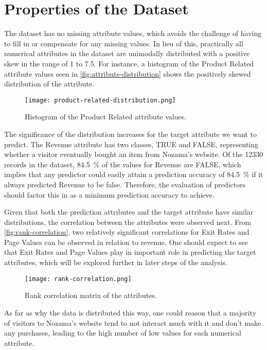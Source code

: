 \documentclass[../cmpe-251-project-report.tex]{subfiles}
\begin{document}
  \chapter{Properties of the Dataset}\label{ch:dataset-properties}
  The dataset has no missing attribute values, which avoids the challenge of having to fill in or compensate for any missing values. In lieu of this, practically all numerical attributes in the dataset are unimodally distributed with a positive skew in the range of 1 to 7.5. For instance, a histogram of the Product Related attribute values seen in \autoref{fig:attribute-distribution} shows the positively skewed distribution of the attribute.
  \begin{figure}
    \texttt{[image: product-related-distribution.png]}
    \caption{Histogram of the Product Related attribute values.}
    \label{fig:attribute-distribution}
  \end{figure}
  The significance of the distribution increases for the target attribute we want to predict. The Revenue attribute has two classes, TRUE and FALSE, representing whether a visitor eventually bought an item from Nozama's website. Of the \num{12330} records in the dataset, \qty{84.5}{\percent} of the values for Revenue are FALSE, which implies that any predictor could easily attain a prediction accuracy of \qty{84.5}{\percent} if it always predicted Revenue to be false. Therefore, the evaluation of predictors should factor this in as a minimum prediction accuracy to achieve.

  Given that both the prediction attributes and the target attribute have similar distributions, the correlation between the attributes were observed next. From \autoref{fig:rank-correlation}, two relatively significant correlations for Exit Rates and Page Values can be observed in relation to revenue. One should expect to see that Exit Rates and Page Values play in important role in predicting the target attributes, which will be explored further in later steps of the analysis.
  \begin{figure}
    \texttt{[image: rank-correlation.png]}
    \caption{Rank correlation matrix of the attributes.}
    \label{fig:rank-correlation}
  \end{figure}
  As far as why the data is distributed this way, one could reason that a majority of visitors to Nozama's website tend to not interact much with it and don't make any purchases, leading to the high number of low values for each numerical attribute.
\end{document}
